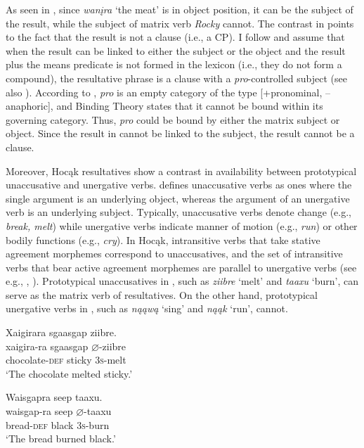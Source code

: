 \documentclass[output=paper]{LSP/langsci}
\begin{document}
As seen in , since \textit{wanįra} `the meat' is in object position, it can be the subject of the result, while the subject of matrix verb \textit{Rocky} cannot. The contrast in  points to the fact that the result is not a clause (i.e., a CP). I follow \citet{Li1999} and assume that when the result can be linked to either the subject or the object and the result plus the means predicate is not formed in the lexicon (i.e., they do not form a compound), the resultative phrase is a clause with a \textit{pro}-controlled subject (see also \citealt{Song2005}). According to \citet{Chomsky1982}, \textit{pro} is an empty category of the type [+pronominal, --anaphoric], and Binding Theory states that it cannot be bound within its governing category. Thus, \textit{pro} could be bound by either the matrix subject or object. Since the result in  cannot be linked to the subject, the result cannot be a clause.

Moreover, Hocąk resultatives show a contrast in availability between prototypical unaccusative and unergative verbs. \citet{Perlmutter1978} defines unaccusative verbs as ones where the single argument is an underlying object, whereas the argument of an unergative verb is an underlying subject. Typically, unaccusative verbs denote change (e.g., \textit{break, melt}) while unergative verbs indicate manner of motion (e.g., \textit{run}) or other bodily functions (e.g., \textit{cry}). In Hocąk, intransitive verbs that take stative agreement morphemes correspond to unaccusatives, and the set of intransitive verbs that bear active agreement morphemes are parallel to unergative verbs (see e.g., \citealt{Williamson1984}, \citealt{Woolford2010}). Prototypical unaccusatives in , such as \textit{ziibre} `melt' and \textit{taaxu} `burn', can serve as the matrix verb of resultatives. On the other hand, prototypical unergative verbs in , such as \textit{nąąwą} `sing' and \textit{nąąk} `run', cannot.

\begin{exe}
\ex
\begin{xlist}

\ex \glll Xaigirara sgaasgap {ziibre}. \\
 xaigira-ra sgaasgap {$\varnothing$}-ziibre\\
chocolate-\textsc{def} sticky \textsc{3s}-melt\\
\glt `The chocolate melted sticky.'

\ex \glll Waisgapra seep {taaxu}.\\
 waisgap-ra seep {$\varnothing$}-taaxu\\
bread-\textsc{def} black \textsc{3s}-burn\\
\glt `The bread burned black.'

\end{xlist}
\end{exe}
\end{document}
